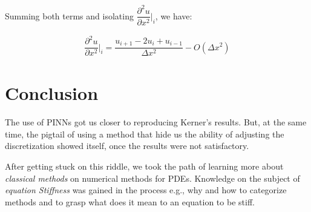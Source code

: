 \documentclass[12pt]{article}
\begin{document}
Summing both terms and isolating
\(\dfrac{\partial^2{u}}{\partial{x^2}}\biggr\rvert_i\), we have:

\begin{equation}
\begin{aligned}
\dfrac{\partial^2{u}}{\partial{x^2}}\biggr\rvert_i = \dfrac{u_{i+1}-2u_i+u_{i-1}}{\Delta{x^2}} - O(\Delta{x^2})
\end{aligned}
\end{equation}

\section{Conclusion}
\label{sec:org79e9334}
The use of PINNs got us closer to reproducing Kerner's
results. But, at the same time, the pigtail of using a method that
hide us the ability of adjusting the discretization showed itself,
once the results were not satisfactory.

After getting stuck on this riddle, we took the path of learning more
about \emph{classical methods} on numerical methods for PDEs. Knowledge on
the subject of \emph{equation Stiffness} was gained in the process e.g., why
and how to categorize methods and to grasp what does it mean to an
equation to be stiff.


\end{document}

